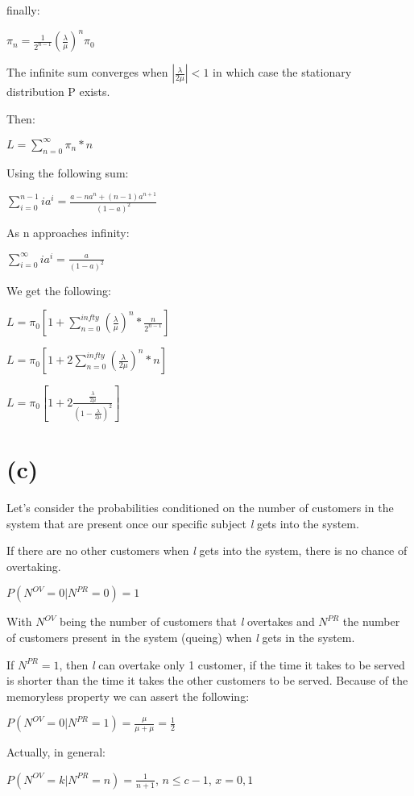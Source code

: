 \documentclass[]{article}
\begin{document}
finally:

\(\pi_n = \frac{1}{2^{n-1}} (\frac{\lambda}{\mu})^{n} \pi_0\)

The infinite sum converges when \(|\frac{\lambda}{2 \mu}| < 1\) in which
case the stationary distribution P exists.

Then:

\(L = \sum_{n=0}^{\infty} \pi_n * n\)

Using the following sum:

\(\sum_{i=0}^{n-1} i a^i = \frac{a - na^n + (n-1)a^{n+1}}{(1-a)^2}\)

As n approaches infinity:

\(\sum_{i=0}^{\infty} i a^i = \frac{a}{(1-a)^2}\)

We get the following:

\(L = \pi_0 [1 + \sum_{n=0}^{infty} (\frac{\lambda}{\mu})^n * \frac{n}{2^{n-1}}]\)

\(L = \pi_0 [1 + 2 \sum_{n=0}^{infty} (\frac{\lambda}{2 \mu})^n * n]\)

\(L = \pi_0 [1 + 2 \frac{\frac{\lambda}{2 \mu}}{(1 - \frac{\lambda}{2 \mu})^2}]\)

\hypertarget{c-1}{%
\section{(c)}\label{c-1}}

Let's consider the probabilities conditioned on the number of customers
in the system that are present once our specific subject \emph{l} gets
into the system.

If there are no other customers when \emph{l} gets into the system,
there is no chance of overtaking.

\(P(N^{OV} = 0 | N^{PR} = 0) = 1\)

With \(N^{OV}\) being the number of customers that \emph{l} overtakes
and \(N^{PR}\) the number of customers present in the system (queing)
when \emph{l} gets in the system.

If \(N^{PR} = 1\), then \emph{l} can overtake only 1 customer, if the
time it takes to be served is shorter than the time it takes the other
customers to be served. Because of the memoryless property we can assert
the following:

\(P(N^{OV} = 0 | N^{PR} = 1) = \frac{\mu}{\mu + \mu} = \frac{1}{2}\)

Actually, in general:

\(P(N^{OV} = k | N^{PR} = n) = \frac{1}{n+1}\), \(n \leq c - 1\),
\(x = 0,1\)
\end{document}
